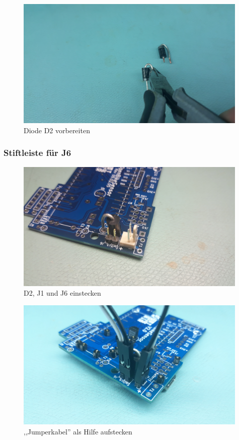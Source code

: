 \documentclass[12pt, a4paper]{article}		%
\begin{document}
\begin{figure}[H]
	\centering
		\includegraphics[width=0.99\textwidth]{Grafiken/20200726_125423.jpg}
	\caption{Diode D2 vorbereiten}
	\label{fig:20200726_125423}
\end{figure}


\subsubsection{Stiftleiste für J6}
\begin{figure}[H]
	\centering
		\includegraphics[width=0.99\textwidth]{Grafiken/20200902_151939.jpg}
	\caption{D2, J1 und J6 einstecken}
	\label{fig:20200902_151939}
\end{figure}

\begin{figure}[H]
	\centering
		\includegraphics[width=0.99\textwidth]{Grafiken/20200726_175301.jpg}
	\caption{,,Jumperkabel'' als Hilfe aufstecken}
	\label{fig:20200726_175301}
\end{figure}
\end{document}
